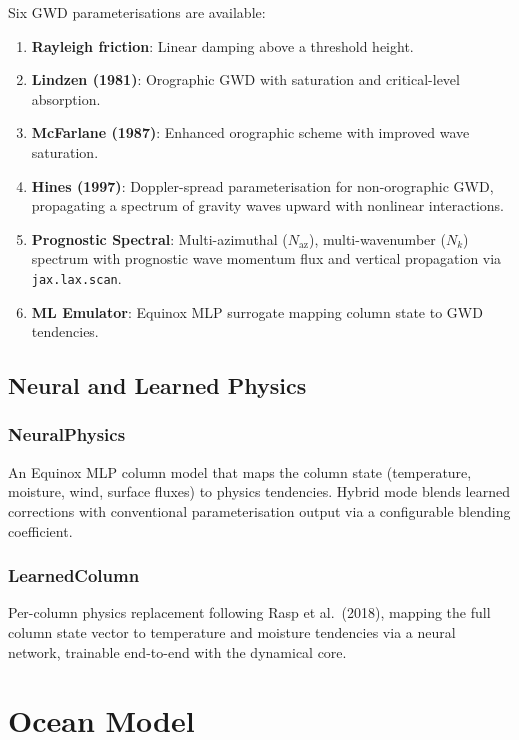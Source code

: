 \documentclass[11pt,twoside]{report}
\begin{document}
Six GWD parameterisations are available:
\begin{enumerate}[nosep]
  \item \textbf{Rayleigh friction}: Linear damping above a threshold height.
  \item \textbf{Lindzen (1981)}: Orographic GWD with saturation and critical-level absorption.
  \item \textbf{McFarlane (1987)}: Enhanced orographic scheme with improved wave saturation.
  \item \textbf{Hines (1997)}: Doppler-spread parameterisation for non-orographic GWD, propagating a spectrum of gravity waves upward with nonlinear interactions.
  \item \textbf{Prognostic Spectral}: Multi-azimuthal ($N_{\mathrm{az}}$), multi-wavenumber ($N_k$) spectrum with prognostic wave momentum flux and vertical propagation via \texttt{jax.lax.scan}.
  \item \textbf{ML Emulator}: Equinox MLP surrogate mapping column state to GWD tendencies.
\end{enumerate}

\section{Neural and Learned Physics}

\subsection{NeuralPhysics}
An Equinox MLP column model that maps the column state (temperature, moisture, wind, surface fluxes) to physics tendencies.  Hybrid mode blends learned corrections with conventional parameterisation output via a configurable blending coefficient.

\subsection{LearnedColumn}
Per-column physics replacement following Rasp et al.\ (2018), mapping the full column state vector to temperature and moisture tendencies via a neural network, trainable end-to-end with the dynamical core.


\chapter{Ocean Model}
\label{ch:ocean}
\end{document}
